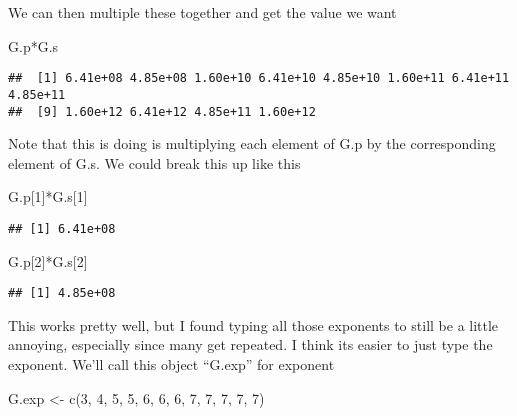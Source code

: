 \documentclass[
]{book}
\newenvironment{Shaded}{\begin{snugshade}}{\end{snugshade}}
\newcommand{\DecValTok}[1]{\textcolor[rgb]{0.00,0.00,0.81}{#1}}
\newcommand{\FunctionTok}[1]{\textcolor[rgb]{0.00,0.00,0.00}{#1}}
\newcommand{\NormalTok}[1]{#1}
\newcommand{\OtherTok}[1]{\textcolor[rgb]{0.56,0.35,0.01}{#1}}
\newcommand{\SpecialCharTok}[1]{\textcolor[rgb]{0.00,0.00,0.00}{#1}}
\begin{document}
We can then multiple these together and get the value we want

\begin{Shaded}
\begin{Highlighting}[]
\NormalTok{G.p}\SpecialCharTok{*}\NormalTok{G.s}
\end{Highlighting}
\end{Shaded}

\begin{verbatim}
##  [1] 6.41e+08 4.85e+08 1.60e+10 6.41e+10 4.85e+10 1.60e+11 6.41e+11 4.85e+11
##  [9] 1.60e+12 6.41e+12 4.85e+11 1.60e+12
\end{verbatim}

Note that this is doing is multiplying each element of G.p by the corresponding element of G.s. We could break this up like this

\begin{Shaded}
\begin{Highlighting}[]
\NormalTok{G.p[}\DecValTok{1}\NormalTok{]}\SpecialCharTok{*}\NormalTok{G.s[}\DecValTok{1}\NormalTok{]}
\end{Highlighting}
\end{Shaded}

\begin{verbatim}
## [1] 6.41e+08
\end{verbatim}

\begin{Shaded}
\begin{Highlighting}[]
\NormalTok{G.p[}\DecValTok{2}\NormalTok{]}\SpecialCharTok{*}\NormalTok{G.s[}\DecValTok{2}\NormalTok{]}
\end{Highlighting}
\end{Shaded}

\begin{verbatim}
## [1] 4.85e+08
\end{verbatim}

This works pretty well, but I found typing all those exponents to still be a little annoying, especially since many get repeated. I think its easier to just type the exponent. We'll call this object ``G.exp'' for exponent

\begin{Shaded}
\begin{Highlighting}[]
\NormalTok{G.exp }\OtherTok{\textless{}{-}} \FunctionTok{c}\NormalTok{(}\DecValTok{3}\NormalTok{, }\DecValTok{4}\NormalTok{,    }\DecValTok{5}\NormalTok{, }\DecValTok{5}\NormalTok{, }\DecValTok{6}\NormalTok{, }\DecValTok{6}\NormalTok{, }\DecValTok{6}\NormalTok{, }\DecValTok{7}\NormalTok{, }\DecValTok{7}\NormalTok{, }\DecValTok{7}\NormalTok{, }\DecValTok{7}\NormalTok{, }\DecValTok{7}\NormalTok{)}
\end{Highlighting}
\end{Shaded}
\end{document}

